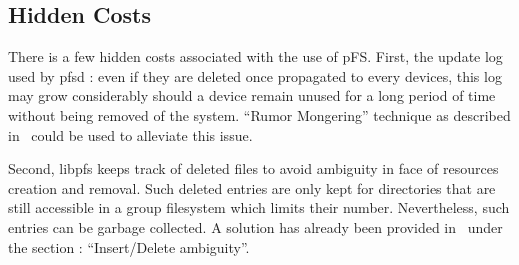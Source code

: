 \subsection{Hidden Costs}

There is a few hidden costs associated with the use of pFS. First, the
update log used by pfsd : even if they are deleted once propagated to
every devices, this log may grow considerably should a device remain
unused for a long period of time without being removed of the
system. ``Rumor Mongering'' technique as described
in~\cite{demers:epidemic} could be used to alleviate this issue.

Second, libpfs keeps track of deleted files to avoid ambiguity
in face of resources creation and removal. Such deleted entries are
only kept for directories that are still accessible in a group
filesystem which limits their number. Nevertheless, such entries can
be garbage collected. A solution has already been provided
in~\cite{page:ficus} under the section : ``Insert/Delete ambiguity''.

\endinput


